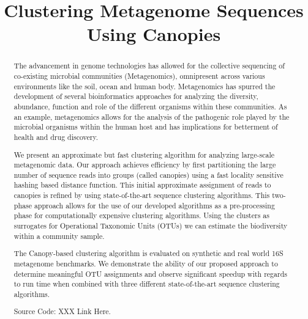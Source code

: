 \documentclass[10pt, conference, compsocconf]{IEEEtran}
\begin{document}
\title{Clustering Metagenome Sequences Using Canopies}

\author{
}
\maketitle

\begin{abstract}
	
The advancement in genome technologies has allowed for the 
collective sequencing of co-existing microbial communities (Metagenomics), omnipresent 
across various environments like the soil, ocean and human body.
%
 Metagenomics has 
spurred the development of several 
bioinformatics approaches for analyzing 
the diversity, abundance, function and role of the 
different organisms 
within these communities. 
%
As an example,  metagenomics allows for the analysis 
of the pathogenic role played by the microbial organisms within the 
human host and has implications for betterment of health and drug discovery. 


We present 
an approximate  but fast 
clustering algorithm
for analyzing 
large-scale metagenomic data. Our approach 
achieves efficiency 
by first partitioning the large number of sequence reads into 
groups (called canopies) using a fast locality sensitive hashing based 
distance function. This 
initial approximate assignment of reads to 
canopies is refined by using 
state-of-the-art
sequence clustering algorithms. This
two-phase 
approach allows for the
use  of 
our developed algorithms as a pre-processing phase for computationally expensive 
clustering 
algorithms. Using the clusters as surrogates for 
Operational Taxonomic Units (OTUs) we 
can estimate  the biodiversity within 
a community sample.

The Canopy-based clustering algorithm is evaluated on synthetic and real 
world 16S 
metagenome  benchmarks. We demonstrate the ability 
of our proposed approach to  
determine meaningful OTU assignments and observe
significant speedup with regards 
to run time when combined with three 
different state-of-the-art sequence clustering algorithms. 


Source Code: XXX Link Here.
\end{abstract}
\end{document}
